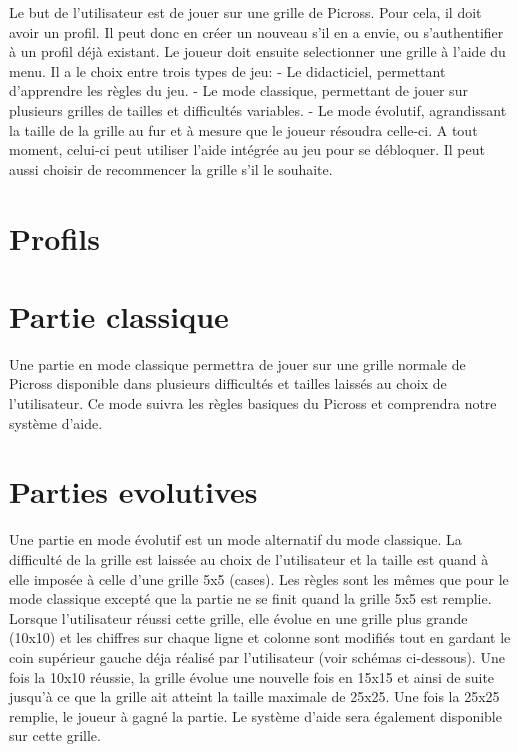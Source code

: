 \documentclass{report}
\begin{document}
	Le but de l'utilisateur est de jouer sur une grille de Picross.
Pour cela, il doit avoir un profil. Il peut donc en créer un nouveau s'il en a envie, ou s'authentifier à un profil déjà existant.
	Le joueur doit ensuite selectionner une grille à l'aide du menu. Il a le choix entre trois types de jeu:
	- Le didacticiel, permettant d'apprendre les règles du jeu. 
	- Le mode classique, permettant de jouer sur plusieurs grilles de tailles et difficultés variables.
	- Le mode évolutif, agrandissant la taille de la grille au fur et à mesure que le joueur résoudra celle-ci.
	A tout moment, celui-ci peut utiliser l'aide intégrée au jeu pour se débloquer. Il peut aussi choisir de recommencer la grille s'il le souhaite.

      
	\section{Profils}
	\section{Partie classique}
	
	Une partie en mode classique permettra de jouer sur une grille normale de Picross disponible dans plusieurs difficultés et tailles laissés au choix de l'utilisateur. Ce mode suivra les règles basiques du Picross et comprendra notre système d'aide.
	
	\section{Parties evolutives}
	
	Une partie en mode évolutif est un mode alternatif du mode classique. La difficulté de la grille est laissée au choix de l'utilisateur et la taille est quand à elle imposée à celle d'une grille 5x5 (cases). Les règles sont les mêmes que pour le mode classique excepté que la partie ne se finit quand la grille 5x5 est remplie. Lorsque l'utilisateur réussi cette grille, elle évolue en une grille plus grande (10x10) et les chiffres sur chaque ligne et colonne sont modifiés tout en gardant le coin supérieur gauche déja réalisé par l'utilisateur (voir schémas ci-dessous). Une fois la 10x10 réussie, la grille évolue une nouvelle fois en 15x15 et ainsi de suite jusqu'à ce que la grille ait atteint la taille maximale de 25x25. Une fois la 25x25 remplie, le joueur à gagné la partie. Le système d'aide sera également disponible sur cette grille.
	
	
\end{document}
